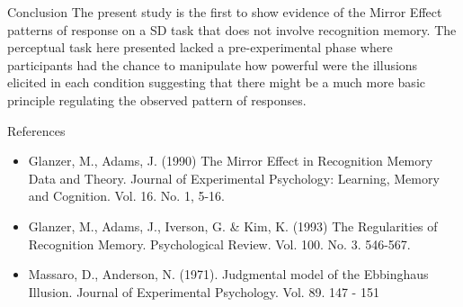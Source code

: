 \documentclass[final]{beamer}
\newlength{\onecolwid}
\begin{document}
\begin{frame}[t]
\begin{columns}[t]
\begin{column}{\onecolwid}
\begin{alertblock}{Conclusion}
The present study is the first to show evidence of the Mirror Effect patterns of response on a SD task that does not involve recognition memory. The perceptual task here presented lacked a pre-experimental phase where participants had the chance to manipulate how powerful were the illusions elicited in each condition suggesting that there might be a much more basic principle regulating the observed pattern of responses.

\end{alertblock}


\begin{alertblock}{References}

\begin{itemize}
\item Glanzer, M., Adams, J. (1990) The Mirror Effect in Recognition Memory \: Data and Theory. Journal of Experimental Psychology: Learning, Memory and Cognition. Vol. 16. No. 1, 5-16.
\item Glanzer, M., Adams, J., Iverson, G. \& Kim, K. (1993) The Regularities of Recognition Memory. Psychological Review. Vol. 100. No. 3. 546-567.
\item Massaro, D., Anderson, N. (1971). Judgmental model of the Ebbinghaus Illusion. Journal of Experimental Psychology. Vol. 89. 147 - 151
\end{itemize}


\end{alertblock}


\end{column} %
\end{columns} %
\end{frame} %
\end{document}
